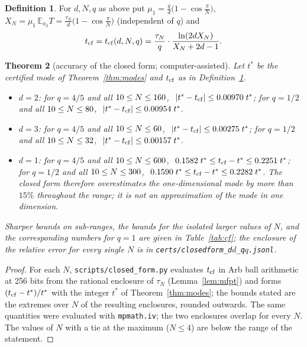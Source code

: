 \documentclass[11pt,a4paper]{article}
\newtheorem{theorem}{Theorem}
\theoremstyle{definition}
\newtheorem{definition}[theorem]{Definition}
\theoremstyle{remark}
\begin{document}
\begin{definition}\label{def:cf}
For $d,N,q$ as above put $\mu_1=\frac qd\bigl(1-\cos\frac\pi N\bigr)$, $X_N=\mu_1\,\mathbb E_{x_0}T=\frac{\tau_N}{d}\bigl(1-\cos\frac\pi N\bigr)$ (independent of $q$) and
\[
t_{\rm cf}=t_{\rm cf}(d,N,q)=\frac{\tau_N}{q}\cdot\frac{\ln(2dX_N)}{X_N+2d-1}.
\]
\end{definition}

\begin{theorem}[accuracy of the closed form; computer-assisted]\label{thm:cf}
Let $t^*$ be the certified mode of Theorem~\ref{thm:modes} and $t_{\rm cf}$ as in Definition~\ref{def:cf}.
\begin{itemize}
\item[(a)] $d=2$: for $q=4/5$ and all $10\le N\le160$, $\ |t^*-t_{\rm cf}|\le0.00970\;t^*$; for $q=1/2$ and all $10\le N\le80$, $\ |t^*-t_{\rm cf}|\le0.00954\;t^*$.
\item[(b)] $d=3$: for $q=4/5$ and all $10\le N\le60$, $\ |t^*-t_{\rm cf}|\le0.00275\;t^*$; for $q=1/2$ and all $10\le N\le32$, $\ |t^*-t_{\rm cf}|\le0.00157\;t^*$.
\item[(c)] $d=1$: for $q=4/5$ and all $10\le N\le600$, $\ 0.1582\;t^*\le t_{\rm cf}-t^*\le0.2251\;t^*$; for $q=1/2$ and all $10\le N\le300$, $\ 0.1590\;t^*\le t_{\rm cf}-t^*\le0.2282\;t^*$. The closed form therefore overestimates the one-dimensional mode by more than $15\%$ throughout the range; it is \emph{not} an approximation of the mode in one dimension.
\end{itemize}
Sharper bounds on sub-ranges, the bounds for the isolated larger values of $N$, and the corresponding numbers for $q=1$ are given in Table~\ref{tab:cf}; the enclosure of the relative error for every single $N$ is in \texttt{certs/closedform\_d$d$\_q$q$.jsonl}.
\end{theorem}
\begin{proof}
For each $N$, \texttt{scripts/closed\_form.py} evaluates $t_{\rm cf}$ in Arb ball arithmetic at 256 bits from the rational enclosure of $\tau_N$ (Lemma~\ref{lem:mfpt}) and forms $(t_{\rm cf}-t^*)/t^*$ with the integer $t^*$ of Theorem~\ref{thm:modes}; the bounds stated are the extremes over $N$ of the resulting enclosures, rounded outwards. The same quantities were evaluated with \texttt{mpmath.iv}; the two enclosures overlap for every $N$. The values of $N$ with a tie at the maximum ($N\le4$) are below the range of the statement.
\end{proof}
\end{document}
